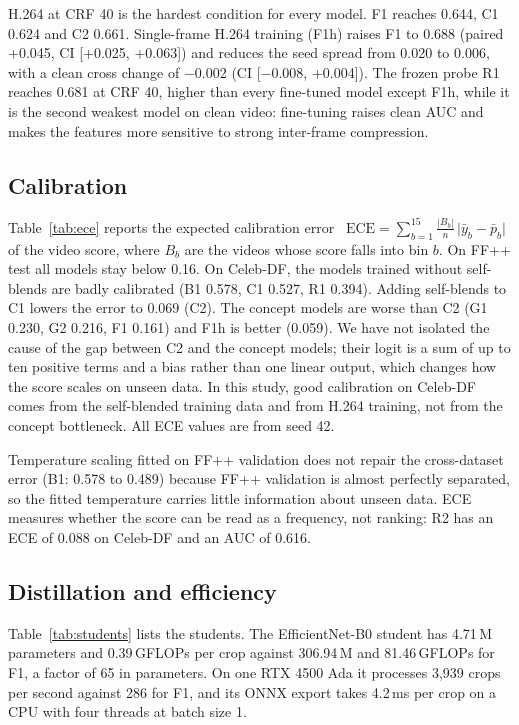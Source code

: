 \documentclass[conference]{IEEEtran}
\begin{document}
H.264 at CRF 40 is the hardest condition for every model. F1 reaches 0.644, C1 0.624 and C2 0.661. Single-frame H.264
training (F1h) raises F1 to 0.688 (paired +0.045, CI [+0.025, +0.063]) and reduces the seed spread from 0.020 to
0.006, with a clean cross change of $-$0.002 (CI [$-$0.008, +0.004]). The frozen probe R1 reaches 0.681 at CRF 40,
higher than every fine-tuned model except F1h, while it is the second weakest model on clean video: fine-tuning
raises clean AUC and makes the features more sensitive to strong inter-frame compression.



\subsection{Calibration}
Table~\ref{tab:ece} reports the expected calibration error~\cite{guo}
$\mathrm{ECE}=\sum_{b=1}^{15}\frac{|B_b|}{n}\,\bigl|\bar y_b - \bar p_b\bigr|$ of the video score, where $B_b$ are
the videos whose score falls into bin $b$. On FF++ test all models stay below 0.16. On Celeb-DF, the models trained
without self-blends are badly calibrated (B1 0.578, C1 0.527, R1 0.394). Adding self-blends to C1 lowers the error
to 0.069 (C2). The concept models are worse than C2 (G1 0.230, G2 0.216, F1 0.161) and F1h is better (0.059). We
have not isolated the cause of the gap between C2 and the concept models; their logit is a sum of up to ten positive
terms and a bias rather than one linear output, which changes how the score scales on unseen data. In this study,
good calibration on Celeb-DF comes from the self-blended training data and from H.264 training, not from the concept
bottleneck. All ECE values are from seed 42.

Temperature scaling fitted on FF++ validation does not repair the cross-dataset error (B1: 0.578 to 0.489) because
FF++ validation is almost perfectly separated, so the fitted temperature carries little information about unseen
data. ECE measures whether the score can be read as a frequency, not ranking: R2 has an ECE of 0.088 on Celeb-DF and
an AUC of 0.616.



\subsection{Distillation and efficiency}
Table~\ref{tab:students} lists the students. The EfficientNet-B0 student has 4.71\,M parameters and 0.39\,GFLOPs per
crop against 306.94\,M and 81.46\,GFLOPs for F1, a factor of 65 in parameters. On one RTX 4500 Ada it processes
3,939 crops per second against 286 for F1, and its ONNX export takes 4.2\,ms per crop on a CPU with four threads
at batch size 1.
\end{document}
